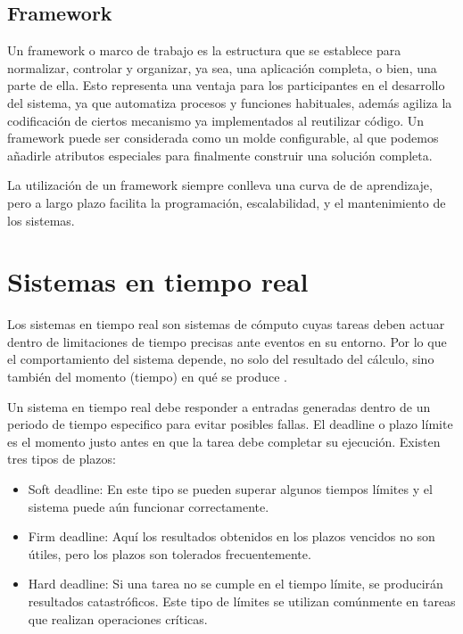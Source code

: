     \subsection{Framework}
Un \gls{framework} o marco de trabajo es la estructura que se establece para normalizar, controlar y organizar, ya sea, una aplicación completa, o bien, una parte de ella. Esto representa una ventaja para los participantes en el desarrollo del sistema, ya que automatiza procesos y funciones habituales, además agiliza la codificación de ciertos mecanismo ya implementados al reutilizar código.
Un \gls{framework} puede ser considerada como un molde configurable, al que podemos añadirle atributos especiales para finalmente construir una solución completa.

\vspace{0.3cm}
La utilización de un framework siempre conlleva una curva de de aprendizaje, pero a largo plazo facilita la programación, escalabilidad, y el mantenimiento de los sistemas.
		
    \section{Sistemas en tiempo real}\label{sec:sistr}

    Los sistemas en tiempo real son sistemas de cómputo cuyas tareas deben actuar dentro de limitaciones de tiempo precisas ante eventos en su entorno. Por lo que el comportamiento del sistema depende, no solo del resultado del cálculo, sino también del momento (tiempo) en qué se produce \cite{Buta2011}.
        
    \vspace{0.3cm}
    Un sistema en tiempo real debe  responder a entradas generadas dentro de un periodo de tiempo especifico para evitar posibles fallas. El \gls{deadline} o plazo límite es el momento justo antes en que la tarea debe completar su ejecución. Existen tres tipos de plazos: 
\begin{itemize}
\item Soft \gls{deadline}: En este tipo se pueden superar algunos tiempos límites y el sistema puede aún funcionar correctamente.
\item Firm \gls{deadline}: Aquí los resultados obtenidos en los plazos vencidos no son útiles, pero los plazos son tolerados frecuentemente.
\item Hard \gls{deadline}: Si una tarea no se cumple en el tiempo límite, se producirán resultados catastróficos. Este tipo de límites se utilizan comúnmente en tareas que realizan operaciones críticas.
\end{itemize}   

